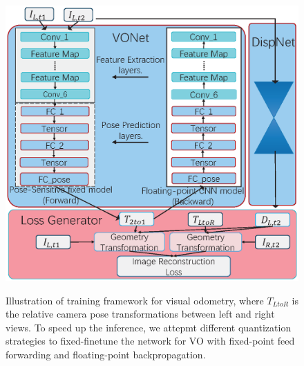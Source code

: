 \begin{figure}[htb]  
    \centering  
    {\includegraphics[width=0.9\linewidth]{fig/depth_vo_feat.eps}}
    \caption{Illustration of training framework for visual odometry, where $T_{LtoR}$ is the relative camera pose transformations between left and right views. To speed up the inference, we attepmt different quantization strategies to fixed-finetune the network for VO with fixed-point feed forwarding and floating-point backpropagation.}
    \label{fig:dvo}
\end{figure}


